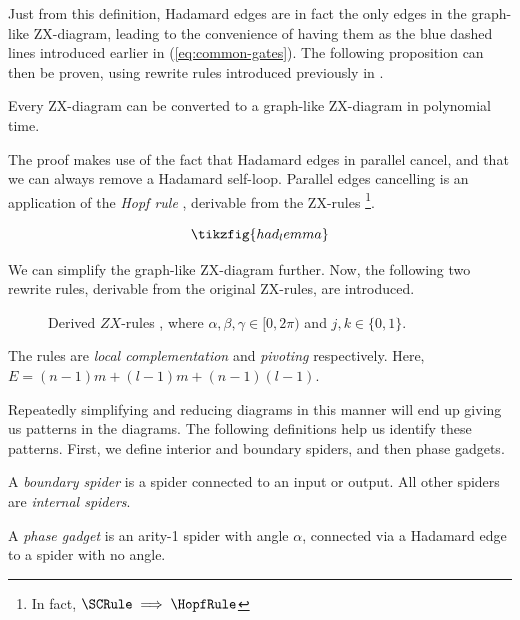 Just from this definition, Hadamard edges are in fact the only edges in the graph-like ZX-diagram,
leading to the convenience of having them as the blue dashed lines introduced earlier in (\ref{eq:common-gates}).
The following proposition can then be proven, using rewrite rules introduced previously in .

\begin{proposition}
  \label{prop:zx-to-graph}
  Every ZX-diagram can be converted to a graph-like ZX-diagram in polynomial time.
\end{proposition}

The proof \cite{Kissinger2024,Duncan2020graphtheoretic} makes use of the fact that Hadamard edges in parallel cancel,
and that we can always remove a Hadamard self-loop.
Parallel edges cancelling is an application of the \textit{Hopf rule} \HopfRule, 
derivable from the ZX-rules
\footnote{In fact, $\SCRule \implies \HopfRule$}.

\begin{equation}
\label{eq:hopf}
\tikzfig{had_lemma}
\end{equation}

We can simplify the graph-like ZX-diagram further.
Now, the following two rewrite rules, derivable from the original ZX-rules, are introduced.

\begin{figure}[h!]
\caption{
  Derived $ZX$-rules \cite{Duncan2020graphtheoretic}, 
  where $\alpha,\beta,\gamma\in [0,2\pi)$ and $j,k\in\{0,1\}$.
}\label{table:deriv}
\end{figure}    


The rules are \textit{local complementation} \LCRule and \textit{pivoting} \PivotRule respectively.
Here, $E = (n-1)m + (l-1)m + (n-1)(l-1)$.

Repeatedly simplifying and reducing diagrams in this manner will end up giving us patterns in the diagrams.
The following definitions help us identify these patterns.
First, we define interior and boundary spiders, and then phase gadgets.

\begin{definition}
  A \textit{boundary spider} is a spider connected to an input or output.
  All other spiders are \textit{internal spiders}.
\end{definition}

\begin{definition}
  A \textit{phase gadget} is an arity-1 spider with angle $\alpha$, 
  connected via a Hadamard edge to a spider with no angle.

\end{definition}

